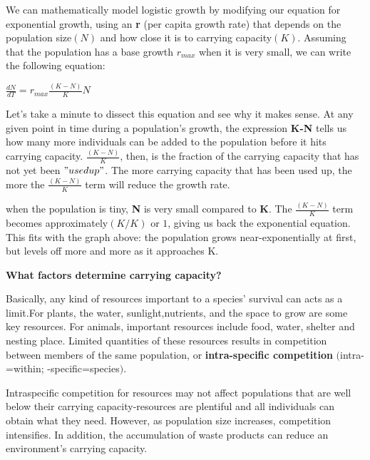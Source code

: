 \documentclass[a4paper,12pt]{report}
\numberwithin{equation}{section}
\begin{document}
\begin{center}
\end{center}

We can mathematically model logistic growth by modifying our equation for exponential growth, using an \textbf{r} (per capita growth rate) that depends on the population size$(N)$ and how close it is to carrying capacity$(K)$. Assuming that the population has a  base growth $r_{max}$ when it is very small, we can write the following equation:\\

\begin{center}
$\frac{dN}{dT}=r_{max}\frac{(K-N)}{K}N$
\end{center}

\indent Let's take a minute to dissect this equation and see why it makes sense. At any given point in time during a population's growth, the expression \textbf{K-N} tells us how many more individuals can be added to the population before it hits carrying capacity. $\frac{(K-N)}{K}$, then, is the fraction of the carrying capacity that has not yet been $"used up"$. The more carrying capacity that has been used up, the more the $\frac{(K-N)}{K}$ term will reduce the growth rate.

\indent when the population is tiny, \textbf{N} is very small compared to \textbf{K}. The $\frac{(K-N)}{K}$ term becomes approximately$(K/K)$ or $1$, giving us back the exponential equation. This fits with the graph above: the population grows near-exponentially at first, but levels off more and more as it approaches K.\\

\begin{center}
\textbf{What factors determine carrying capacity?}
\end{center}

\indent Basically, any kind of resources important to a species' survival can acts as a limit.For plants, the water, sunlight,nutrients, and the space to grow are some key resources. For animals, important resources include food, water, shelter and nesting place. Limited quantities of these resources results in competition between members of the same population, or \textbf{intra-specific competition} $($intra-=within; -specific=species$)$.

\indent Intraspecific competition for resources may not affect populations that are well below  their carrying capacity-resources are plentiful and all individuals can obtain what they need. However, as population size increases, competition intensifies. In addition, the accumulation of waste products can reduce an environment's carrying capacity.\\								
\end{document}
